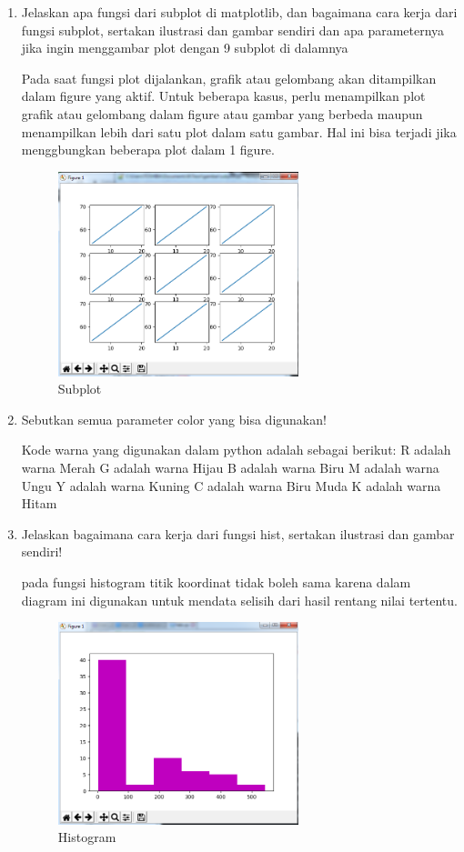 \begin{enumerate}
\item Jelaskan apa fungsi dari subplot di matplotlib, dan bagaimana cara kerja dari
fungsi subplot, sertakan ilustrasi dan gambar sendiri dan apa parameternya jika
ingin menggambar plot dengan 9 subplot di dalamnya
\par
Pada saat fungsi plot dijalankan, grafik atau gelombang akan ditampilkan dalam figure yang aktif. Untuk beberapa kasus, perlu menampilkan plot grafik atau gelombang dalam figure atau gambar yang berbeda maupun menampilkan lebih dari satu plot dalam satu gambar. Hal ini bisa terjadi jika menggbungkan beberapa plot dalam 1 figure.

\begin{figure}[H]
\centering
\includegraphics[width=7cm]{figures/6/1174050/Teori/subplot.png}
\caption{Subplot}
\end{figure}


\item Sebutkan semua parameter color yang bisa digunakan!
\par
Kode warna yang digunakan dalam python adalah sebagai berikut:
R adalah warna Merah
G adalah warna Hijau
B adalah warna Biru
M adalah warna Ungu
Y adalah warna Kuning
C adalah warna Biru Muda
K adalah warna Hitam

\item Jelaskan bagaimana cara kerja dari fungsi hist, sertakan ilustrasi dan gambar
sendiri!
\par
pada fungsi histogram titik koordinat tidak boleh sama karena dalam diagram ini digunakan untuk mendata selisih dari hasil rentang nilai tertentu.

\begin{figure}[H]
\centering
\includegraphics[width=7cm]{figures/6/1174050/Teori/3histo.png}
\caption{Histogram}
\end{figure}



\end{enumerate}
